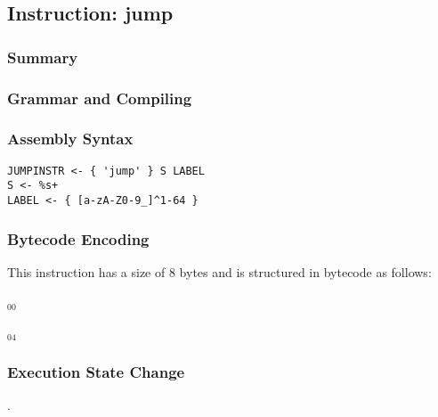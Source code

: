 \subsection{Instruction: jump}

\subsubsection{Summary}


\subsubsection{Grammar and Compiling}


\subsubsection{Assembly Syntax}

\begin{myquote}
\begin{verbatim}
JUMPINSTR <- { 'jump' } S LABEL
S <- %s+
LABEL <- { [a-zA-Z0-9_]^1-64 }
\end{verbatim}
\end{myquote}


\subsubsection{Bytecode Encoding}

This instruction has a size of 8 bytes and is structured in bytecode as follows:

$_{00}$\ 



$_{04}$\ 


\subsubsection{Execution State Change}

.


